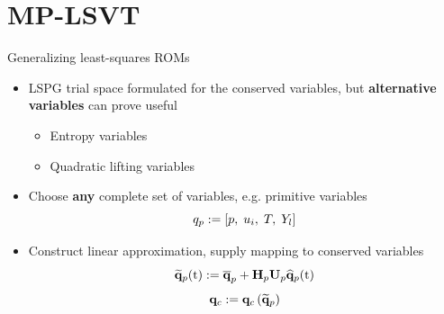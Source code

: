 \documentclass[]{beamer}
\begin{document}
\section*{MP-LSVT}

\begin{frame}{Generalizing least-squares ROMs}
    \begin{itemize}
		\item LSPG trial space formulated for the conserved variables, but \textbf{alternative variables} can prove useful
		\begin{itemize}
			\item Entropy variables
			\item Quadratic lifting variables
		\end{itemize}
		\item Choose \textbf{any} complete set of variables, e.g. primitive variables
		\begin{equation*}
			q_p := \left[ p, \; u_i, \; T, \; Y_l \right]
		\end{equation*}
		\item Construct linear approximation, supply mapping to conserved variables
		\begin{equation*}
			\primVecRom(\timeVar) \defEq \primVecCent + \primScale \primTrial \primVecCoef(\timeVar)
		\end{equation*}
		\begin{equation*}
			\mathbf{q}_{c} := \mathbf{q}_{c} \left( \mathbf{\widetilde{q}}_{p} \right)
		\end{equation*}
	\end{itemize}
\end{frame}
\end{document}
